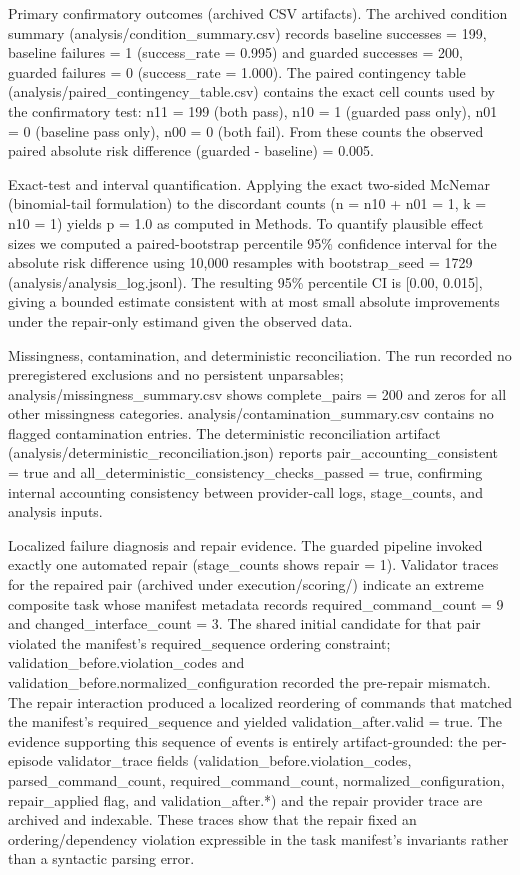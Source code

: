 \documentclass[conference]{IEEEtran}
\begin{document}
Primary confirmatory outcomes (archived CSV artifacts). The archived condition summary (analysis/condition\_summary.csv) records baseline successes = 199, baseline failures = 1 (success\_rate = 0.995) and guarded successes = 200, guarded failures = 0 (success\_rate = 1.000). The paired contingency table (analysis/paired\_contingency\_table.csv) contains the exact cell counts used by the confirmatory test: n11 = 199 (both pass), n10 = 1 (guarded pass only), n01 = 0 (baseline pass only), n00 = 0 (both fail). From these counts the observed paired absolute risk difference (guarded - baseline) = 0.005.

Exact-test and interval quantification. Applying the exact two-sided McNemar (binomial-tail formulation) to the discordant counts (n = n10 + n01 = 1, k = n10 = 1) yields p = 1.0 as computed in Methods. To quantify plausible effect sizes we computed a paired-bootstrap percentile 95\% confidence interval for the absolute risk difference using 10,000 resamples with bootstrap\_seed = 1729 (analysis/analysis\_log.jsonl). The resulting 95\% percentile CI is [0.00, 0.015], giving a bounded estimate consistent with at most small absolute improvements under the repair-only estimand given the observed data.

Missingness, contamination, and deterministic reconciliation. The run recorded no preregistered exclusions and no persistent unparsables; analysis/missingness\_summary.csv shows complete\_pairs = 200 and zeros for all other missingness categories. analysis/contamination\_summary.csv contains no flagged contamination entries. The deterministic reconciliation artifact (analysis/deterministic\_reconciliation.json) reports pair\_accounting\_consistent = true and all\_deterministic\_consistency\_checks\_passed = true, confirming internal accounting consistency between provider-call logs, stage\_counts, and analysis inputs.

Localized failure diagnosis and repair evidence. The guarded pipeline invoked exactly one automated repair (stage\_counts shows repair = 1). Validator traces for the repaired pair (archived under execution/scoring/) indicate an extreme composite task whose manifest metadata records required\_command\_count = 9 and changed\_interface\_count = 3. The shared initial candidate for that pair violated the manifest's required\_sequence ordering constraint; validation\_before.violation\_codes and validation\_before.normalized\_configuration recorded the pre-repair mismatch. The repair interaction produced a localized reordering of commands that matched the manifest's required\_sequence and yielded validation\_after.valid = true. The evidence supporting this sequence of events is entirely artifact-grounded: the per-episode validator\_trace fields (validation\_before.violation\_codes, parsed\_command\_count, required\_command\_count, normalized\_configuration, repair\_applied flag, and validation\_after.*) and the repair provider trace are archived and indexable. These traces show that the repair fixed an ordering/dependency violation expressible in the task manifest's invariants rather than a syntactic parsing error.
\end{document}
